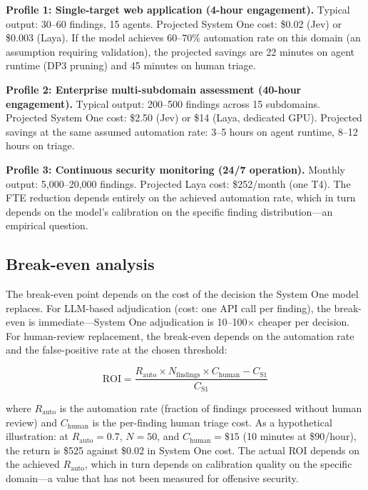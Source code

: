 \documentclass[conference]{IEEEtran}
\begin{document}
\textbf{Profile 1: Single-target web application (4-hour engagement).} Typical output: 30--60 findings, 15 agents. Projected System One cost: \$0.02 (Jev) or \$0.003 (Laya). If the model achieves 60--70\% automation rate on this domain (an assumption requiring validation), the projected savings are 22 minutes on agent runtime (DP3 pruning) and 45 minutes on human triage.

\textbf{Profile 2: Enterprise multi-subdomain assessment (40-hour engagement).} Typical output: 200--500 findings across 15 subdomains. Projected System One cost: \$2.50 (Jev) or \$14 (Laya, dedicated GPU). Projected savings at the same assumed automation rate: 3--5 hours on agent runtime, 8--12 hours on triage.

\textbf{Profile 3: Continuous security monitoring (24/7 operation).} Monthly output: 5,000--20,000 findings. Projected Laya cost: \$252/month (one T4). The FTE reduction depends entirely on the achieved automation rate, which in turn depends on the model's calibration on the specific finding distribution---an empirical question.

\subsection{Break-even analysis}

The break-even point depends on the cost of the decision the System One model replaces. For LLM-based adjudication (cost: one API call per finding), the break-even is immediate---System One adjudication is 10--100$\times$ cheaper per decision. For human-review replacement, the break-even depends on the automation rate and the false-positive rate at the chosen threshold:

\begin{equation}
\text{ROI} = \frac{R_{\text{auto}} \times N_{\text{findings}} \times C_{\text{human}} - C_{\text{S1}}}{C_{\text{S1}}}
\end{equation}

where $R_{\text{auto}}$ is the automation rate (fraction of findings processed without human review) and $C_{\text{human}}$ is the per-finding human triage cost. As a hypothetical illustration: at $R_{\text{auto}} = 0.7$, $N = 50$, and $C_{\text{human}} = \$15$ (10 minutes at \$90/hour), the return is \$525 against \$0.02 in System One cost. The actual ROI depends on the achieved $R_{\text{auto}}$, which in turn depends on calibration quality on the specific domain---a value that has not been measured for offensive security.
\end{document}
